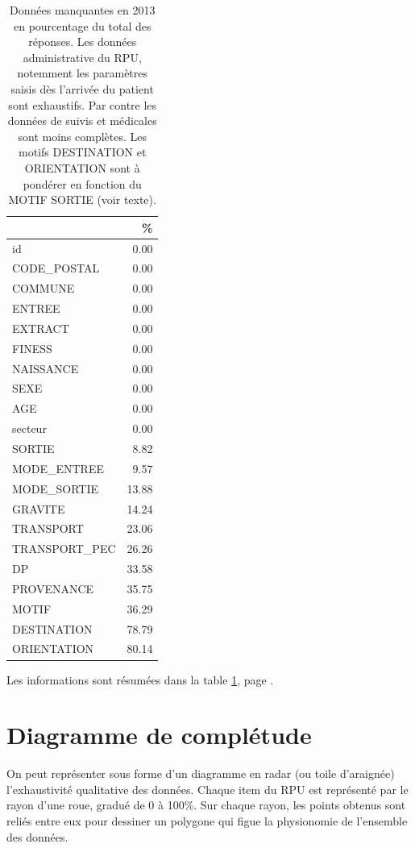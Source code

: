 \documentclass[12pt,english,french,twoside]{book}\usepackage[]{graphicx}\usepackage[]{color}
\begin{document}
\begin{table}[ht]
\centering
\begin{tabular}{|l|r|}
  \hline
 & \% \\ 
  \hline
id & 0.00 \\ 
  CODE\_POSTAL & 0.00 \\ 
  COMMUNE & 0.00 \\ 
  ENTREE & 0.00 \\ 
  EXTRACT & 0.00 \\ 
  FINESS & 0.00 \\ 
  NAISSANCE & 0.00 \\ 
  SEXE & 0.00 \\ 
  AGE & 0.00 \\ 
  secteur & 0.00 \\ 
  SORTIE & 8.82 \\ 
  MODE\_ENTREE & 9.57 \\ 
  MODE\_SORTIE & 13.88 \\ 
  GRAVITE & 14.24 \\ 
  TRANSPORT & 23.06 \\ 
  TRANSPORT\_PEC & 26.26 \\ 
  DP & 33.58 \\ 
  PROVENANCE & 35.75 \\ 
  MOTIF & 36.29 \\ 
  DESTINATION & 78.79 \\ 
  ORIENTATION & 80.14 \\ 
   \hline
\end{tabular}
\caption{Données manquantes en 2013 en pourcentage du total des réponses. Les données administrative du RPU, notemment les paramètres saisis dès l'arrivée du patient sont exhaustifs. Par contre les données de suivis et médicales sont moins complètes. Les motifs DESTINATION et ORIENTATION sont à pondérer en fonction du MOTIF SORTIE (voir texte).} 
\label{tab2}
\end{table}


Les informations sont résumées dans la table \ref{tab2}, page \pageref{tab2}.

\section{Diagramme de complétude}

On peut représenter sous forme d'un diagramme en radar (ou toile d'araignée) l'exhaustivité qualitative des données. Chaque item du RPU est représenté par le rayon d'une roue, gradué de 0 à 100\%. Sur chaque rayon, les points obtenus sont reliés entre eux pour dessiner un polygone qui figue la physionomie de l'ensemble des données.
\end{document}
